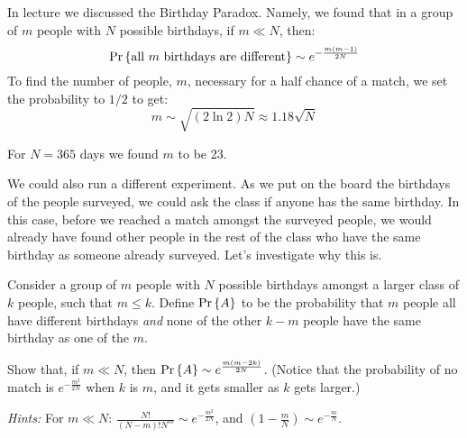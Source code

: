 \documentclass[12pt,twoside]{article}
\begin{document}
\begin{problem}{20}
In lecture we discussed the Birthday Paradox. Namely, we found that in a group of $m$ people with $N$ possible birthdays, if $m \ll N$, then:
\[
\mathop{\textup{Pr}}\nolimits\left\{\text{all $m$ birthdays are different}\right\} \sim e^{-\frac{m(m-1)}{2N}}
\]
To find the number of people, $m$, necessary for a half chance of a match, we set the probability to $1/2$ to get:
\[
m \sim \sqrt{(2\ln2)N} \approx 1.18\sqrt{N}
\]

For $N = 365$ days we found $m$ to be 23.

We could also run a different experiment. As we put on the board the birthdays of the people surveyed, we could ask the class if anyone has the same birthday. In this case, before we reached a match amongst the surveyed people, we would already have found other people in the rest of the class who have the same birthday as someone already surveyed. Let's investigate why this is.

\bparts
{} Consider a group of $m$ people with $N$ possible birthdays amongst a larger class of $k$ people, such that $m \leq k$. Define $\mathop{\textup{Pr}}\nolimits\left\{A\right\}$ to be the probability that $m$ people all have different birthdays \textit{and} none of the other $k-m$ people have the same birthday as one of the $m$.

Show that, if $m \ll N$, then $\mathop{\textup{Pr}}\nolimits\left\{A\right\} \sim e^{\frac{m(m-2k)}{2N}}$. (Notice that the probability of no match is $e^{-\frac{m^2}{2N}}$ when $k$ is $m$, and it gets smaller as $k$ gets larger.)

\hspace{0.5in} \textit{Hints:} For $m \ll N$: $\frac{N!}{(N-m)!N^m} \sim e^{-\frac{m^2}{2N}}$, and $(1-\frac{m}{N}) \sim e^{-\frac{m}{N}}$.



\end{problem}
\end{document}
